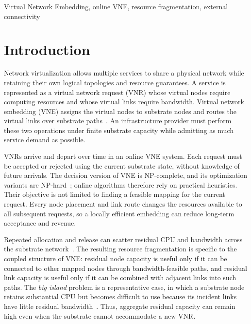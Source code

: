\documentclass{ieeeaccess}
\begin{document}
\begin{keywords}
	Virtual Network Embedding, online VNE, resource fragmentation, external connectivity
\end{keywords}

\titlepgskip=-21pt
\maketitle

\section{Introduction}
\label{sec:introduction}

Network virtualization allows multiple services to share a physical network while retaining their
own logical topologies and resource guarantees. A service is represented as a virtual network
request (VNR) whose virtual nodes require computing resources and whose virtual links require
bandwidth. Virtual network embedding (VNE) assigns the virtual nodes to substrate nodes and routes
the virtual links over substrate paths~\cite{satpathy2025virtual}. An infrastructure provider must
perform these two operations under finite substrate capacity while admitting as much service demand
as possible.

VNRs arrive and depart over time in an online VNE system. Each request must be accepted or rejected
using the current substrate state, without knowledge of future arrivals. The decision version of VNE
is NP-complete, and its optimization variants are NP-hard~\cite{rost2020hardness}; online algorithms
therefore rely on practical heuristics. Their objective is not limited to finding a feasible mapping
for the current request. Every node placement and link route changes the resources available to all
subsequent requests, so a locally efficient embedding can reduce long-term acceptance and revenue.

Repeated allocation and release can scatter residual CPU and bandwidth across the substrate
network~\cite{fischer2013virtual}. The resulting resource fragmentation is specific to the coupled
structure of VNE: residual node capacity is useful only if it can be connected to other mapped nodes
through bandwidth-feasible paths, and residual link capacity is useful only if it can be combined
with adjacent links into such paths. The \emph{big island} problem is a representative case, in which
a substrate node retains substantial CPU but becomes difficult to use because its incident links
have little residual bandwidth~\cite{gong2014toward}. Thus, aggregate residual capacity can remain
high even when the substrate cannot accommodate a new VNR.
\end{document}
